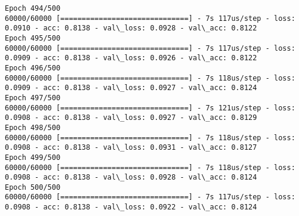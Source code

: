 \documentclass[11pt]{article}
\begin{document}
\begin{Verbatim}[commandchars=\\\{\}]
Epoch 494/500
60000/60000 [==============================] - 7s 117us/step - loss: 0.0910 - acc: 0.8138 - val\_loss: 0.0928 - val\_acc: 0.8122
Epoch 495/500
60000/60000 [==============================] - 7s 117us/step - loss: 0.0909 - acc: 0.8138 - val\_loss: 0.0926 - val\_acc: 0.8122
Epoch 496/500
60000/60000 [==============================] - 7s 118us/step - loss: 0.0909 - acc: 0.8138 - val\_loss: 0.0927 - val\_acc: 0.8124
Epoch 497/500
60000/60000 [==============================] - 7s 121us/step - loss: 0.0908 - acc: 0.8138 - val\_loss: 0.0927 - val\_acc: 0.8129
Epoch 498/500
60000/60000 [==============================] - 7s 118us/step - loss: 0.0908 - acc: 0.8138 - val\_loss: 0.0931 - val\_acc: 0.8127
Epoch 499/500
60000/60000 [==============================] - 7s 118us/step - loss: 0.0908 - acc: 0.8138 - val\_loss: 0.0928 - val\_acc: 0.8124
Epoch 500/500
60000/60000 [==============================] - 7s 117us/step - loss: 0.0908 - acc: 0.8138 - val\_loss: 0.0922 - val\_acc: 0.8124

    \end{Verbatim}
\end{document}
